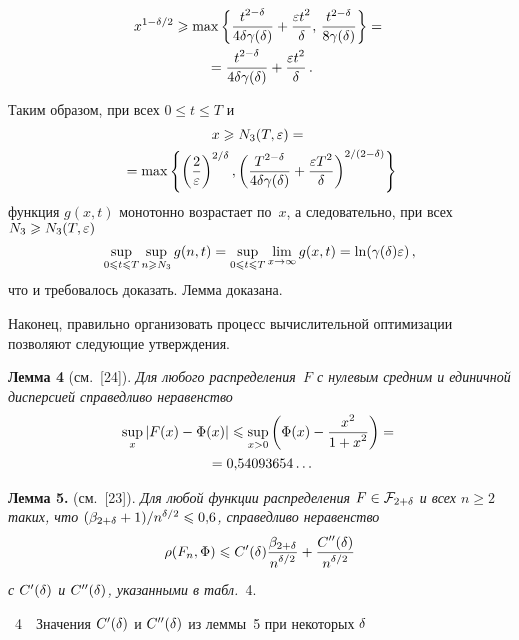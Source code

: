 \begin{multicols}{2}
\noindent
\begin{multline*}
x^{1-\d/2} \ge \max\left\{\fr{t^{2-\delta}}{4\d\gd} + \fr{\eps
t^2}{\delta},\, \frac{t^{2-\delta}}{8\gd}\right\}={}\\
{}=
\fr{t^{2-\delta}}{4\d\gd} + \fr{\eps t^2}{\delta}\,.
\end{multline*}

Таким образом, при всех $0\le t\le T$ и
\begin{multline*}
x \ge  N_3(T,\eps)={}\\
{}= \max \left\{
\left(\fr{2}{\eps}\right)^{2/\delta}, \left( \fr{
T^{2-\delta}}{4\d\gd} + \fr{\eps
T^2}{\delta}\right)^{2/(2-\delta)} \right\}
\end{multline*}
функция $g(x,t)$ монотонно возрастает по~$x$, а следовательно, при
всех $N_3\ge N_3(T,\eps)$
$$
\sup\limits_{0\le t\le T}\sup\limits_{n \ge N_3} g(n,t) = \sup\limits_{0\le t\le
T}\lim_{x\rightarrow\infty} g(x,t) = \ln(\gd\eps)\,,
$$
что и требовалось доказать. Лемма доказана.

\medskip

Наконец, правильно организовать процесс вычислительной оптимизации
позволяют следующие утверждения.

\noindent
\textbf{Лемма 4} (см.~[24]). %
\textit{Для любого распределения~$F$ с нулевым средним и единичной
дисперсией справедливо неравенство}
\begin{multline*}
\sup\limits_{x}|F(x)-\Phi(x)|\le
\sup\limits_{x>0}\left(\Phi(x)-\fr{x^2}{1+x^2}\right)={}\\
{}= 0{,}54093654\ldots
\end{multline*}

\medskip

\noindent
\textbf{Лемма 5.} (см.~[23]). %
\textit{Для любой функции распределения $F\in\F_{2+\d}$ и всех $n\ge2$
таких, что $(\bet+1)/n^{\d/2}\le0{,}6$, справедливо неравенство
$$
\rho(F_n,\Phi) \le
C'(\d)\fr{\bet}{n^{\d/2}}+\fr{C''(\d)}{n^{\d/2}}
$$
с $C'(\d)$ и $C''(\d)$, указанными в
табл.}~4.

\smallskip

\begin{center} %
\noindent
\parbox{56mm}{{\tablename~4}\ \ \small{Значения $C'(\d)$ и
$C''(\d)$ из леммы~5 при некоторых $\d$}}
\vspace*{2pt}


\end{center}
\end{multicols}
